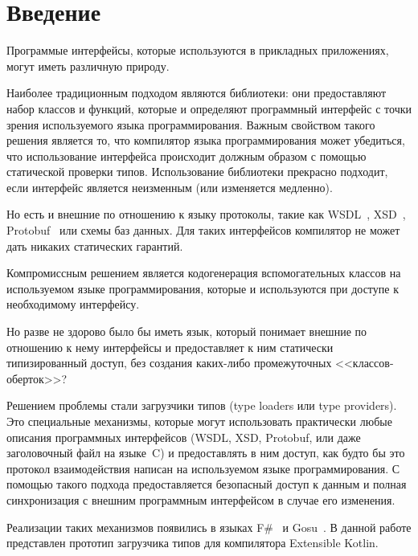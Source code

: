 \clearpage
\section{Введение}

Программые интерфейсы, которые используются в прикладных приложениях, могут иметь различную природу.

Наиболее традиционным подходом являются библиотеки: они предоставляют набор классов и функций, которые и определяют программный интерфейс с точки зрения используемого языка программирования.
Важным свойством такого решения является то, что компилятор языка программирования может убедиться, что использование интерфейса происходит должным образом с помощью статической проверки типов. Использование библиотеки прекрасно подходит, если интерфейс является неизменным (или изменяется медленно).

Но есть и внешние по отношению к языку протоколы, такие как WSDL~\cite{wsdl}, XSD~\cite{xsd1, xsd2}, Protobuf~\cite{protobuf} или схемы баз данных. Для таких интерфейсов компилятор не может дать никаких статических гарантий.

Компромиссным решением является кодогенерация вспомогательных классов на используемом языке программирования, которые и используются при доступе к необходимому интерфейсу.

Но разве не здорово было бы иметь язык, который понимает внешние по отношению к нему интерфейсы и предоставляет к ним статически типизированный доступ, без создания каких-либо промежуточных <<классов-оберток>>?

Решением проблемы стали загрузчики типов (type loaders или type providers). Это специальные механизмы, которые могут использовать практически любые описания программных интерфейсов
(WSDL, XSD, Protobuf, или даже заголовочный файл на языке~C) и предоставлять в ним доступ, как будто бы это протокол взаимодействия написан на используемом языке программирования.
С помощью такого подхода предоставляется безопасный доступ к данным и полная синхронизация с внешним программным интерфейсом в случае его изменения.

Реализации таких механизмов появились в языках F\#~\cite{fsharp2010expert} и Gosu~\cite{gosuguide}. В данной работе представлен прототип загрузчика типов для компилятора Extensible Kotlin.

\clearpage